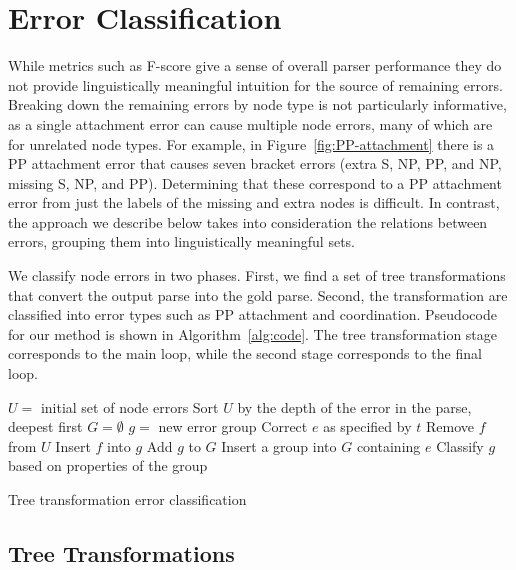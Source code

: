 \section{Error Classification}

While metrics such as F-score give a sense of overall parser performance they do not provide linguistically meaningful intuition for the source of remaining errors.
Breaking down the remaining errors by node type is not particularly informative, as a single attachment error can cause multiple node errors, many of which are for unrelated node types.
For example, in Figure~\ref{fig:PP-attachment} there is a PP attachment error that causes seven bracket errors (extra S, NP, PP, and NP, missing S, NP, and PP).
Determining that these correspond to a PP attachment error from just the labels of the missing and extra nodes is difficult.
In contrast, the approach we describe below takes into consideration the relations between errors, grouping them into linguistically meaningful sets.

We classify node errors in two phases.  First, we find a set of tree
transformations that convert the output parse into the gold parse.  Second, the
transformation are classified into error types such as PP attachment and
coordination.  Pseudocode for our method is shown in Algorithm~\ref{alg:code}.
The tree transformation stage corresponds to the main loop, while the second
stage corresponds to the final loop.

\begin{algorithm}[t]
\begin{algorithmic}
\State $U =$ initial set of node errors
\State Sort $U$ by the depth of the error in the parse, deepest first
\State $G = \emptyset$
\Repeat
			\State $g =$ new error group
			\State Correct $e$ as specified by $t$
				\State Remove $f$ from $U$
				\State Insert $f$ into $g$
			\EndFor
			\State Add $g$ to $G$
		\EndIf
	\EndFor
{}
	\State Insert a group into $G$ containing $e$
\EndFor
{}
	\State Classify $g$ based on properties of the group
\EndFor
\end{algorithmic}
\caption{ \label{alg:code}
	Tree transformation error classification
}
\end{algorithm}

\subsection{Tree Transformations}

